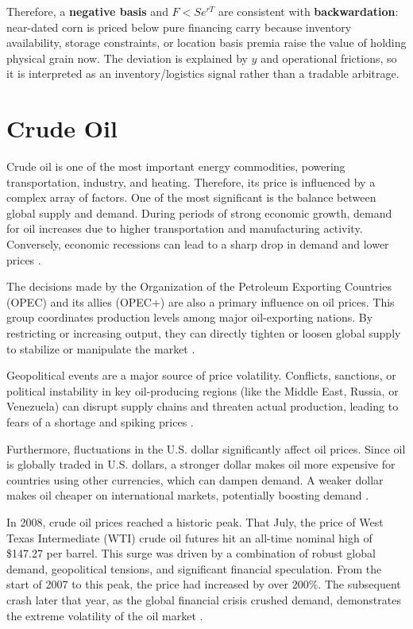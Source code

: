 \documentclass[10pt,a4paper]{article} %
\let\oldsection\section
\renewcommand{\section}{%
      \clearpage
      \thispagestyle{myfancy}%
      \oldsection
    }
\begin{document}
Therefore, a \textbf{negative basis} and $F<S e^{rT}$ are consistent with \textbf{backwardation}: near-dated corn is priced below pure financing carry because inventory availability, storage constraints, or location basis premia raise the value of holding physical grain now. The deviation is explained by $y$ and operational frictions, so it is interpreted as an inventory/logistics signal rather than a tradable arbitrage.


\section{Crude Oil}
Crude oil is one of the most important energy commodities, powering transportation, industry, and heating. Therefore, its price is influenced by a complex array of factors. One of the most significant is the balance between global supply and demand. During periods of strong economic growth, demand for oil increases due to higher transportation and manufacturing activity. Conversely, economic recessions can lead to a sharp drop in demand and lower prices \citep{eia_prices_2023}.

The decisions made by the Organization of the Petroleum Exporting Countries (OPEC) and its allies (OPEC+) are also a primary influence on oil prices. This group coordinates production levels among major oil-exporting nations. By restricting or increasing output, they can directly tighten or loosen global supply to stabilize or manipulate the market \citep{eia_opec_2024}.

Geopolitical events are a major source of price volatility. Conflicts, sanctions, or political instability in key oil-producing regions (like the Middle East, Russia, or Venezuela) can disrupt supply chains and threaten actual production, leading to fears of a shortage and spiking prices \citep{eia_prices_2023}.

Furthermore, fluctuations in the U.S. dollar significantly affect oil prices. Since oil is globally traded in U.S. dollars, a stronger dollar makes oil more expensive for countries using other currencies, which can dampen demand. A weaker dollar makes oil cheaper on international markets, potentially boosting demand \citep{bis_usd_commodity_2023,ecb_oil_usd_2024}.

In 2008, crude oil prices reached a historic peak. That July, the price of West Texas Intermediate (WTI) crude oil futures hit an all-time nominal high of \$147.27 per barrel. This surge was driven by a combination of robust global demand, geopolitical tensions, and significant financial speculation. From the start of 2007 to this peak, the price had increased by over 200\%. The subsequent crash later that year, as the global financial crisis crushed demand, demonstrates the extreme volatility of the oil market \citep{reuters_oil_peak_2008,worldbank_oil_spike_2008}.
\end{document}
